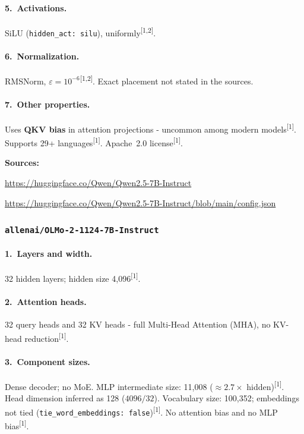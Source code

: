 \documentclass[11pt, a4paper]{article}
\newcommand{\src}[1]{\textsuperscript{\normalfont\small[#1]}}
\begin{document}
\paragraph{5.~Activations.}
SiLU (\texttt{hidden\_act: silu}), uniformly\src{1,2}.

\paragraph{6.~Normalization.}
RMSNorm, $\varepsilon=10^{-6}$\src{1,2}.
Exact placement not stated in the sources.

\paragraph{7.~Other properties.}
Uses \textbf{QKV bias} in attention projections - uncommon among modern
models\src{1}.
Supports 29+ languages\src{1}.
Apache~2.0 license\src{1}.

\noindent\textbf{Sources:}
\begin{enumerate}[noitemsep,label=\small{[\arabic*]},leftmargin=*,topsep=2pt]
\item \small\url{https://huggingface.co/Qwen/Qwen2.5-7B-Instruct}
\item \small\url{https://huggingface.co/Qwen/Qwen2.5-7B-Instruct/blob/main/config.json}
\end{enumerate}

\subsubsection{\texttt{allenai/OLMo-2-1124-7B-Instruct}}

\paragraph{1.~Layers and width.}
32 hidden layers; hidden size 4,096\src{1}.

\paragraph{2.~Attention heads.}
32 query heads and 32 KV heads - full Multi-Head Attention (MHA), no
KV-head reduction\src{1}.

\paragraph{3.~Component sizes.}
Dense decoder; no MoE.
MLP intermediate size: 11,008 ($\approx2.7\times$ hidden)\src{1}.
Head dimension inferred as 128 ($4096/32$).
Vocabulary size: 100,352; embeddings not tied (\texttt{tie\_word\_embeddings:
false})\src{1}.
No attention bias and no MLP bias\src{1}.
\end{document}
